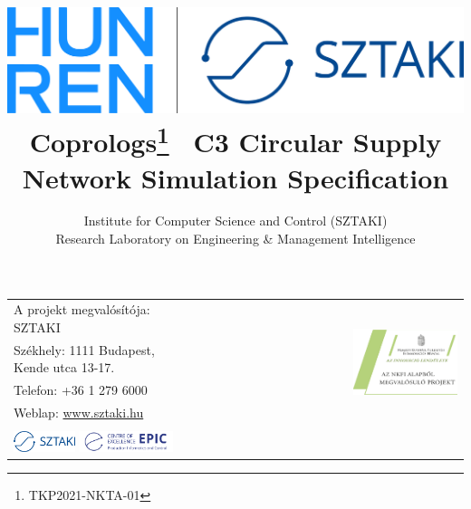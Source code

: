 \documentclass{article}
\begin{document}
\begin{titlepage}
       \vfill
            

		\noindent
       \begin{tabular}{lr}
       		{\scriptsize A projekt megvalósítója: SZTAKI} & \multirow{5}{0.35\textwidth}{\includegraphics[width=0.4\textwidth]{nkfi.png}} \\
			{\scriptsize Székhely: 1111 Budapest, Kende utca 13-17.} & \\
			{\scriptsize Telefon: +36 1 279 6000} & \\
			{\scriptsize Weblap: \href{www.sztaki.hu}{www.sztaki.hu}} & \\
			&\\[4mm]
			\includegraphics[height=6mm]{sztaki.png} \includegraphics[height=6mm]{epic.png} & \\
       \end{tabular}
\end{titlepage}

\title{\includegraphics[scale=0.08]{szines_SZTAKI_hunren_transzparens.png} \\[1cm] Coprologs\footnote{TKP2021-NKTA-01} ~C3 Circular Supply Network Simulation Specification}
\author{Institute for Computer Science and Control (SZTAKI) \\ Research Laboratory on Engineering \& Management Intelligence}
\end{document}
